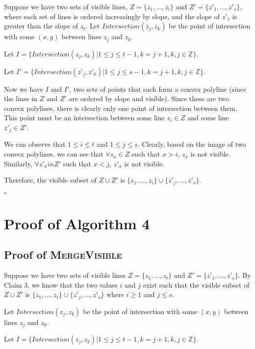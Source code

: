 \documentclass[12pt,letterpaper]{article}
\begin{document}
Suppose we have two sets of visible lines, $Z = \{ z_1, ..., z_t \}$ and $Z' = \{ z'_1, ..., z'_s \}$, where each set of lines is ordered increasingly by slope, and the slope of $z'_1$ is greater than the slope of $z_t$. Let $Intersection(z_j, z_k)$ be the point of intersection with some $(x, y)$ between lines $z_j$ and $z_k$. 

Let $I  = \{ Intersection(z_j, z_k) | 1 \leq j \leq t - 1, k = j + 1, k, j \in \mathbb{Z} \}$.

Let $I' = \{ Intersection(z'_j, z'_k) | 1 \leq j \leq s - 1, k = j + 1, k, j \in \mathbb{Z}  \}$.

Now we have $I$ and $I'$, two sets of points that each form a convex polyline (since the lines in $Z$ and $Z'$ are ordered by slope and visible). Since these are two convex polylines, there is clearly only one point of intersection between them. This point must be an intersection between some line $z_i \in Z$ and some line $z'_j \in Z'$.

We can observe that $1 \leq i \leq t$ and $1 \leq j \leq s$. Clearly, based on the image of two convex polylines, we can see that $\forall z_x \in Z$ such that $x > i$, $z_x$ is not visible. Similarly, $\forall z'_x in Z'$ such that $x < j$, $z'_x$ is not visible.

Therefore, the visible subset of $Z \cup Z'$ is $\{z_1, ..., z_i \} \cup \{ z'_j, ..., z'_s \}$.

$\square$

\section{Proof of Algorithm 4}

\subsection{Proof of \textsc{MergeVisible}}

Suppose we have two sets of visible lines $Z = \{ z_1, ..., z_t \}$ and $ Z' = \{ z'_1, ..., z'_s \}$.
By Claim 3, we know that the two values $i$ and $j$ exist such that the visible subset of $Z \cup Z'$ is 
$\{z_1, ..., z_i \} \cup \{ z'_j, ..., z'_s \}$ where $i \geq 1$ and $j \leq s$.

Let $Intersection(z_j, z_k)$ be the point of intersection with some $(x, y)$ between lines $z_j$ and $z_k$. 

Let $I  = \{ Intersection(z_j, z_k) | 1 \leq j \leq t - 1, k = j + 1, k, j \in \mathbb{Z} \}$.
\end{document}
